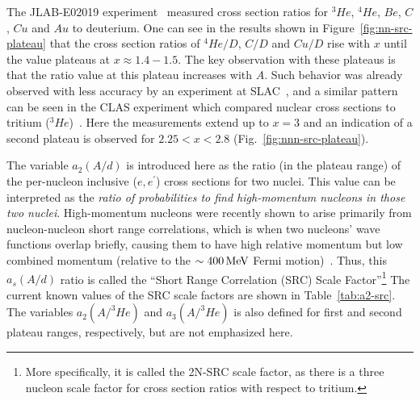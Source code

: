 The JLAB-E02019 experiment~\cite{Fomin:2011ng} measured cross section ratios for $^3He$, $^4He$, $Be$, $C$, $Cu$ and $Au$ to deuterium. One can see in the results shown in Figure~\ref{fig:nn-src-plateau} that the cross section ratios of $^4He/D$, $C/D$ and $Cu/D$ rise with $x$ until the value plateaus at $x \approx 1.4 - 1.5$. The key observation with these plateaus is that the ratio value at this plateau increases with $A$. Such behavior was already observed with less accuracy by an experiment at SLAC~\cite{Frankfurt:1993sp}, and a similar pattern can be seen in the CLAS experiment which compared nuclear cross sections to tritium ($^3He$)~\cite{PhysRevLett.96.082501}. Here the measurements extend up to $x=3$ and an indication of a second plateau is observed for $2.25<x<2.8$ (Fig.~\ref{fig:nnn-src-plateau}). 

The variable $a_2(A/d)$ is introduced here as the ratio (in the plateau range) of the per-nucleon inclusive ($e,e^\prime$) cross sections for two nuclei. This value can be interpreted as the \emph{ratio of probabilities to find high-momentum nucleons in those two nuclei}\cite{PhysRevLett.106.052301}. High-momentum nucleons were recently shown to arise primarily from nucleon-nucleon short range correlations, which is when two nucleons' wave functions overlap briefly, causing them to have high relative momentum but low combined momentum (relative to the $\sim\unit[400]{MeV}$ Fermi motion)~\cite{PhysRevLett.100.162503}.  Thus, this $a_s(A/d)$ ratio is called the ``Short Range Correlation (SRC) Scale Factor''\footnote{More specifically, it is called the 2N-SRC scale factor, as there is a three nucleon scale factor for cross section ratios with respect to tritium.}  The current known values of the SRC scale factors are shown in Table~\ref{tab:a2-src}. The variables $a_2(A/^3He)$ and $a_3(A/^3He)$ is also defined for first and second plateau ranges, respectively, but are not emphasized here.

